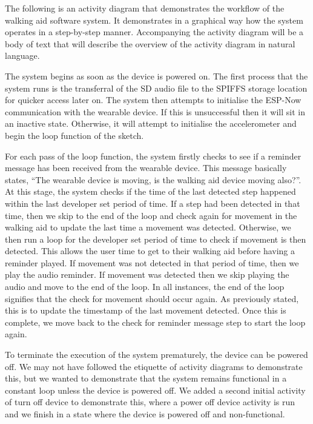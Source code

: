                 The following is an activity diagram that demonstrates the workflow of the walking aid software system. It demonstrates in a graphical way how the system operates in a step-by-step manner. Accompanying the activity diagram will be a body of text that will describe the overview of the activity diagram in natural language.

                
                
                The system begins as soon as the device is powered on. The first process that the system runs is the transferral of the SD audio file to the SPIFFS storage location for quicker access later on. The system then attempts to initialise the ESP-Now communication with the wearable device. If this is unsuccessful then it will sit in an inactive state. Otherwise, it will attempt to initialise the accelerometer and begin the loop function of the sketch. 

                For each pass of the loop function, the system firstly checks to see if a reminder message has been received from the wearable device. This message basically states, ``The wearable device is moving, is the walking aid device moving also?''. At this stage, the system checks if the time of the last detected step happened within the last developer set period of time. If a step had been detected in that time, then we skip to the end of the loop and check again for movement in the walking aid to update the last time a movement was detected. Otherwise, we then run a loop for the developer set period of time to check if movement is then detected. This allows the user time to get to their walking aid before having a reminder played. If movement was not detected in that period of time, then we play the audio reminder. If movement was detected then we skip playing the audio and move to the end of the loop. In all instances, the end of the loop signifies that the check for movement should occur again. As previously stated, this is to update the timestamp of the last movement detected. Once this is complete, we move back to the check for reminder message step to start the loop again.

                To terminate the execution of the system prematurely, the device can be powered off. We may not have followed the etiquette of activity diagrams to demonstrate this, but we wanted to demonstrate that the system remains functional in a constant loop unless the device is powered off. We added a second initial activity of turn off device to demonstrate this, where a power off device activity is run and we finish in a state where the device is powered off and non-functional.

